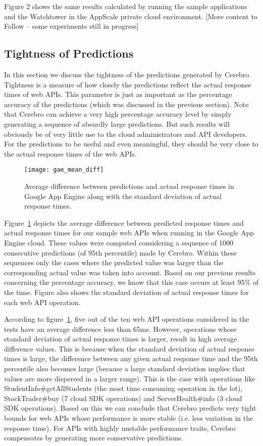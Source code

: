 Figure 2 shows the same results calculated by running the sample applications and the Watchtower in the AppScale private cloud
environment. [More content to Follow -- some experiments still in progress]

\subsection{Tightness of Predictions}
In this section we discuss the tightness of the predictions generated by Cerebro. Tightness is a measure of how closely the predictions
reflect the actual response times of web APIs. This parameter is just as important as the percentage accuracy of the predictions (which 
was discussed in the previous section). Note that Cerebro can achieve a very high percentage accuracy level by simply generating a 
sequence of absurdly large predictions. But such results will obviously be of very little use to the cloud administrators and API
developers. For the predictions to be useful and even meaningful, they should be very close to the actual response times of the web APIs.

\begin{figure}
\centering
\texttt{[image: gae\_mean\_diff]}
\caption{Average difference between predictions and actual response times in Google App Engine along with the standard deviation of actual response times.}
\label{fig:gae_mean_diff}
\end{figure}

Figure~\ref{fig:gae_mean_diff} depicts the average difference between predicted response times and actual response times for
our sample web APIs when running in the Google App Engine cloud. These values 
were computed considering a sequence of 1000 consecutive predictions (of 95th percentile) made by Cerebro. Within these sequences only the cases 
where the predicted value was larger than the corresponding actual value was taken into account. Based on our previous results
concerning the percentage accuracy, we know that this case occurs at least 95\% of the time. Figure also shows the standard
deviation of actual response times for each web API operation.

According to figure~\ref{fig:gae_mean_diff}, five out of the ten web API operations considered in the tests have an average difference less than 65ms.
However, operations whose standard deviation of actual response times is larger, result in high average difference values. This is because when the 
standard deviation of actual response times is large, the difference between any given actual response time and the 95th percentile also becomes
large (because a large standard deviation implies that values are more dispersed in a larger range). This is the case with operations like 
StudentInfo\#getAllStudents (the most time consuming operation in the lot), StockTrader\#buy (7 cloud SDK operations) and 
ServerHealth\#info (3 cloud SDK operations). Based on this we can conclude that Cerebro predicts very tight bounds for web APIs whose
performance is more stable (i.e. less variation in the response time). For APIs with highly unstable performance traits, Cerebro compensates by
generating more conservative predictions. 

